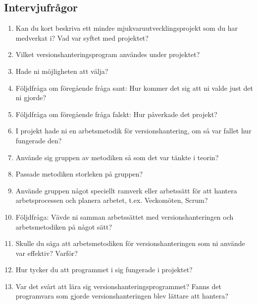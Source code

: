 \subsection{ Intervjufrågor } \vspace{1em}
\begin{enumerate}

  \item Kan du kort beskriva ett mindre mjukvaruutvecklingsprojekt som du har medverkat i? Vad var syftet med projektet?

  \item Vilket versionshanteringsprogram användes under projektet?

  \item Hade ni möjligheten att välja?

  \item Följdfråga om föregående fråga sant: Hur kommer det sig att ni valde just det ni gjorde?
  \item Följdfråga om föregående fråga falskt: Hur påverkade det projekt?

  \item I projekt hade ni en arbetsmetodik för versionshantering, om så var fallet hur fungerade den?

  \item Använde sig gruppen av metodiken så som det var tänkte i teorin?

  \item Passade metodiken storleken på gruppen?

  \item Använde gruppen något speciellt ramverk eller arbetssätt för att hantera arbetsprocessen och planera arbetet, t.ex. Veckomöten, Scrum?

  \item Följdfråga: Vävde ni samman arbetssättet med versionshanteringen och arbetsmetodiken på något sätt?

  \item Skulle du säga att arbetsmetodiken för versionshanteringen som ni använde var effektiv? Varför?

  \item Hur tycker du att programmet i sig fungerade i projektet?

  \item Var det svårt att lära sig versionshanteringsprogrammet? Fanns det programvara som gjorde versionshanteringen blev lättare att hantera?

\end{enumerate}

